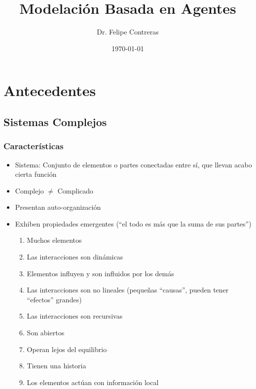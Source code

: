 \documentclass{beamer}
\title{Modelación Basada en Agentes}
\author{Dr. Felipe Contreras}
\date{\today}
\begin{document}
\frame{\titlepage}

\section[Outline]{}
\frame{\tableofcontents}

\section{Antecedentes}

\subsection{Sistemas Complejos}
\begin{frame}[t]
  \frametitle{Características}
  \begin{itemize}[<+-| alert@+>]
  \item Sistema: Conjunto de elementos o partes conectadas entre sí, que llevan acabo cierta función
  \item Complejo $\neq$ Complicado
  \item Presentan auto-organización
  \item Exhiben propiedades emergentes (``el todo es más que la suma de sus partes'')
  \begin{enumerate}[<+-| alert@+>]
  \item Muchos elementos
  \item Las interacciones son dinámicas
  \item Elementos influyen y son influidos por los demás
  \item Las interacciones son no lineales (pequeñas ``causas'', pueden tener ``efectos'' grandes)
  \item Las interacciones son recursivas
  \item Son abiertos %
  \item Operan lejos del equilibrio
  \item Tienen una historia
  \item Los elementos actúan con información local
  \end{enumerate}
  \end{itemize}
  \end{frame}
\end{document}
